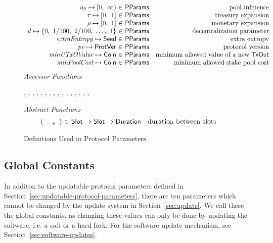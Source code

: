 \begin{figure*}[htb]
\begin{equation*}
\begin{array}{r@{~\in~}lr}
        \var{a_0} \mapsto \nonnegReals & \PParams & \text{pool influence}\\
        \tau \mapsto \unitInterval & \PParams & \text{treasury expansion}\\
        \rho \mapsto \unitInterval & \PParams & \text{monetary expansion}\\
        \var{d} \mapsto \{0,~1/100,~2/100,~\ldots,~1\} & \PParams & \text{decentralization parameter}\\
        \var{extraEntropy} \mapsto \Seed & \PParams & \text{extra entropy}\\
        \var{pv} \mapsto \ProtVer & \PParams & \text{protocol version}\\
        \var{minUTxOValue} \mapsto \Coin & \PParams & \text{minimum allowed value of a new \TxOut}\\
        \var{minPoolCost} \mapsto \Coin & \PParams & \text{minimum allowed stake pool cost}\\
      \end{array}
  \end{equation*}
  \emph{Accessor Functions}
  \begin{center}
    ,
    ,
    ,
    ,
    ,
    ,
    ,
    ,
    ,
    ,
    ,
    ,
    ,
    ,
    ,
    ,
  \end{center}
  \emph{Abstract Functions}
  \begin{equation*}
    \begin{array}{r@{~\in~}lr}
      (\slotminus{}{}) & \Slot \to \Slot \to \Duration
                       & \text{duration between slots}
    \end{array}
  \end{equation*}
  \caption{Definitions Used in Protocol Parameters}
  \label{fig:defs:protocol-parameters}
\end{figure*}

\subsection{Global Constants}
\label{sec:global-constants}

In additon to the updatable protocol parameters defined in
Section~\ref{sec:updatable-protocol-parameters},
there are ten parameters which cannot be changed by the update
system in Section~\ref{sec:update}.
We call these the global constants, as changing these values can only
be done by updating the software, i.e. a soft or a hard fork.
For the software update mechanism, see Section~\ref{sec:software-updates}.

